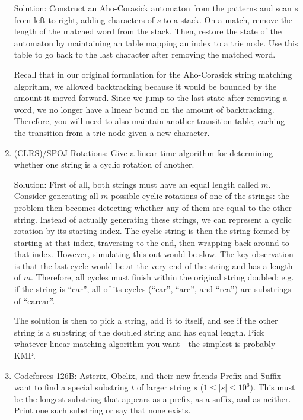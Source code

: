 \documentclass[11pt, oneside]{article}
\begin{document}
\begin{enumerate}
  Solution: Construct an Aho-Corasick automaton from the patterns and scan \( s \) from left to right, adding
  characters of \( s \) to a stack. On a match, remove the length of the matched word from the stack.
  Then, restore the state of the automaton by maintaining an table mapping an index to a trie node.
  Use this table to go back to the last character after removing the matched word.

  Recall that in our original formulation for the Aho-Corasick string matching algorithm,
  we allowed backtracking because it would be bounded by the amount it moved forward.
  Since we jump to the last state after removing a word, we no longer have a linear bound
  on the amount of backtracking. Therefore, you will need to also maintain another transition table,
  caching the transition from a trie node given a new character.

  \item (CLRS)/\href{https://www.spoj.com/problems/EC_WORLD}{SPOJ Rotations}: Give a linear time algorithm for determining whether one string is a cyclic rotation of another.

  Solution: First of all, both strings must have an equal length called \( m \).
  Consider generating all \( m \) possible cyclic rotations of one of the strings: the problem
  then becomes detecting whether any of them are equal to the other string. Instead of
  actually generating these strings, we can represent a cyclic rotation by its starting index.
  The cyclic string is then the string formed by starting at that index, traversing to the end,
  then wrapping back around to that index. However, simulating this out would be slow.
  The key observation is that the last cycle would be at the very end of the string
  and has a length of \( m \). Therefore, all cycles must finish within the original string doubled:
  e.g. if the string is ``car'', all of its cycles (``car'', ``arc'', and ``rca'') are substrings of ``carcar''.

  The solution is then to pick a string, add it to itself, and see if the other string is a substring of the doubled string
  and has equal length. Pick whatever linear matching algorithm you want - the simplest is probably KMP.

  \item \href{https://codeforces.com/problemset/problem/126/B}{Codeforces 126B}: Asterix, Obelix, and their new friends Prefix and Suffix
  want to find a special substring \( t \) of larger string \( s \) (\(1 \leq |s| \leq 10^6 \)).
  This must be the longest substring that appears as a prefix, as a suffix, and as neither.
  Print one such substring or say that none exists.


\end{enumerate}
\end{document}

